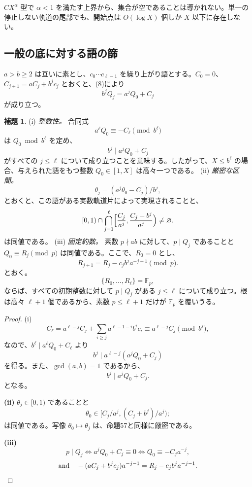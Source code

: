 \documentclass[11pt,reqno]{amsart}
\theoremstyle{definition}
\newtheorem{lemma}[theorem]{補題}
\theoremstyle{definition}
\theoremstyle{remark}
\begin{document}
\(CX^\alpha\) 型で \(\alpha<1\) を満たす上界から、集合が空であることは導かれない。単一の停止しない軌道の尾部でも、開始点は \(O(\log X)\) 個しか \(X\) 以下に存在しない。

\subsection{一般の底に対する語の篩}\label{sec:D.2}

\begin{samepage}\leavevmode\label{layout:carry-intro-start}
\(a>b\ge2\) は互いに素とし、\(c_0\cdots c_{\ell-1}\) を繰り上がり語とする。\(C_0=0\)、\(C_{j+1}=aC_j+b^jc_j\) とおくと、(8)により
\[
b^jQ_j=a^jQ_0+C_j
\]
が成り立つ。
\label{layout:carry-intro-end}\end{samepage}

\begin{samepage}
\begin{lemma}\leavevmode\label{thm:64}
(i) \emph{整数性。} 合同式
\[
a^\ell Q_0\equiv-C_\ell\pmod{b^\ell}
\]
は \(Q_0\bmod b^\ell\) を定め、
\[
b^j\mid a^jQ_0+C_j
\]
がすべての \(j\le\ell\) について成り立つことを意味する。したがって、\(X\le b^\ell\) の場合、与えられた語をもつ整数 \(Q_0\in[1,X]\) は高々一つである。
(ii) \emph{厳密な区間。}
\[
\theta_j=(a^j\theta_0-C_j)/b^j,
\]
とおくと、この語がある実数軌道片によって実現されることと、
\[
[0,1)\cap\bigcap_{j=1}^{\ell}\Bigl[\frac{C_j}{a^j},\frac{C_j+b^j}{a^j}\Bigr)\ne\varnothing .
\]
は同値である。
(iii) \emph{固定約数。} 素数 \(p\nmid ab\) に対して、\(p\mid Q_j\) であることと \(Q_0\equiv R_j\pmod p\) は同値である。ここで、\(R_0=0\) とし、
\[
R_{j+1}=R_j-c_jb^ja^{-j-1}\pmod p.
\]
とおく。
\[
\{R_0,\ldots,R_\ell\}=\mathbb F_p,
\]
ならば、すべての初期整数に対して \(p\mid Q_j\) がある \(j\le\ell\) について成り立つ。根は高々 \(\ell+1\) 個であるから、素数 \(p\le\ell+1\) だけが \(\mathbb F_p\) を覆いうる。
\label{thm-end:64}
\end{lemma}
\end{samepage}

\begin{proof}\leavevmode\label{proof:64}
(i)
\[
C_\ell=a^{\ell-j}C_j+\sum_{i\ge j}a^{\ell-1-i}b^ic_i
\equiv a^{\ell-j}C_j\pmod{b^j},
\]
なので、\(b^\ell\mid a^\ell Q_0+C_\ell\) より
\[
b^j\mid a^{\ell-j}(a^jQ_0+C_j)
\]
を得る。また、\(\gcd(a,b)=1\) であるから、
\[
b^j\mid a^jQ_0+C_j.
\]
となる。

\textbf{(ii)} \(\theta_j\in[0,1)\) であることと
\[
\theta_0\in[C_j/a^j,(C_j+b^j)/a^j);
\]
は同値である。写像 \(\theta_0\mapsto\theta_j\) は、命題57と同様に厳密である。

\textbf{(iii)}
\[
p\mid Q_j\iff a^jQ_0+C_j\equiv0\iff Q_0\equiv-C_ja^{-j},
\]
\[
\text{and}\quad
-(aC_j+b^jc_j)a^{-j-1}=R_j-c_jb^ja^{-j-1}.\qedhere
\]
\end{proof}
\end{document}
